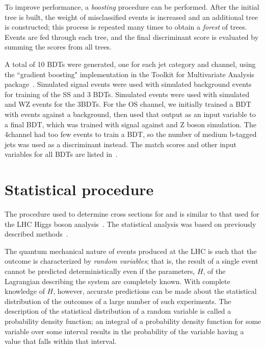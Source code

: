 To improve performance, a \emph{boosting} procedure can be performed. After the
initial tree is built, the weight of misclassified events is increased and an
additional tree is constructed; this process is repeated many times to obtain a
\emph{forest} of trees. Events are fed through each tree, and the final
discriminant score is evaluated by summing the scores from all trees.

A total of 10 BDTs were generated, one for each jet category and channel, using
the ``gradient boosting" implementation in the Toolkit for Multivariate Analysis
package~\cite{Hocker:2007ht}. Simulated \ttW signal events were used with
simulated \ttbar background events for training of the SS \ttW and 3\lep \ttW
BDTs. Simulated \ttZ events were used with simulated \ttbar and WZ events for
the 3\lep \ttZ BDTs. For the OS \ttZ channel, we initially trained a BDT with \ttZ
events against a \ttbar background, then used that output as an input variable to
a final BDT, which was trained with \ttZ signal against \ttbar and Z boson
simulation. The 4\lep channel had too few events to train a BDT, so the number
of medium b-tagged jets was used as a discriminant instead. The match scores and
other input variables for all BDTs are listed
in~.


\section{Statistical procedure}
\label{sec:stats}
The procedure used to determine cross sections for \ttW and \ttZ is similar to
that used for the LHC Higgs boson analysis~\cite{Collaboration2012,
CMS-NOTE-2011-005}. The statistical analysis was based on previously described
methods~\cite{Beringer:1900zz, Cowan2011, BARLOW1990496}.

The quantum mechanical nature of events produced at the LHC is such that the
outcome is characterized by \textit{random variables}; that is, the result of a
single event cannot be predicted deterministically even if the parameters, $H$,
of the Lagrangian describing the system are completely known. With
complete knowledge of $H$, however, accurate predictions can be made about
the statistical distribution of the outcomes of a large number of such
experiments. The description of the statistical distribution of a random
variable is called a probability density function; an integral of a probability
density function for some variable over some interval results in the probability
of the variable having a value that falls within that interval.

